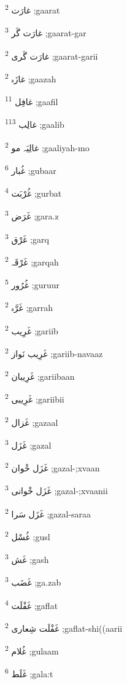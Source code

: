 \documentclass[12pt]{article}
\begin{document}
\begin{RTL}
\begin{multicols}{5}
{\ur غارَت}   \textsuperscript{2} ;gaarat

{\ur غارَت گَر}   \textsuperscript{3} ;gaarat-gar

{\ur غارَت گَری}   \textsuperscript{2} ;gaarat-garii

{\ur غازَہ}   \textsuperscript{2} ;gaazah

{\ur غافِل}   \textsuperscript{11} ;gaafil

{\ur غالِب}   \textsuperscript{113} ;gaalib

{\ur غالِیَہ مو}   \textsuperscript{2} ;gaaliyah-mo

{\ur غُبار}   \textsuperscript{6} ;gubaar

{\ur غُرْبَت}   \textsuperscript{4} ;gurbat

{\ur غَرَض}   \textsuperscript{3} ;gara.z

{\ur غَرْق}   \textsuperscript{3} ;garq

{\ur غَرْقَہ}   \textsuperscript{2} ;garqah

{\ur غُرُور}   \textsuperscript{5} ;guruur

{\ur غَرَّہ}   \textsuperscript{2} ;garrah

{\ur غَرِیب}   \textsuperscript{2} ;gariib

{\ur غَرِیب نَواز}   \textsuperscript{2} ;gariib-navaaz

{\ur غَرِیبان}   \textsuperscript{2} ;gariibaan

{\ur غَرِیبی}   \textsuperscript{2} ;gariibii

{\ur غَزال}   \textsuperscript{2} ;gazaal

{\ur غَزَل}   \textsuperscript{3} ;gazal

{\ur غَزَل خْوان}   \textsuperscript{2} ;gazal-;xvaan

{\ur غَزَل خْوانی}   \textsuperscript{3} ;gazal-;xvaanii

{\ur غَزَل سَرا}   \textsuperscript{2} ;gazal-saraa

{\ur غُسْل}   \textsuperscript{2} ;gusl

{\ur غَش}   \textsuperscript{3} ;gash

{\ur غَضَب}   \textsuperscript{3} ;ga.zab

{\ur غَفْلَت}   \textsuperscript{4} ;gaflat

{\ur غَفْلَت شِعاری}   \textsuperscript{2} ;gaflat-shi((aarii

{\ur غُلام}   \textsuperscript{2} ;gulaam

{\ur غَلَط}   \textsuperscript{6} ;gala:t


\end{multicols}
\end{RTL}
\end{document}
